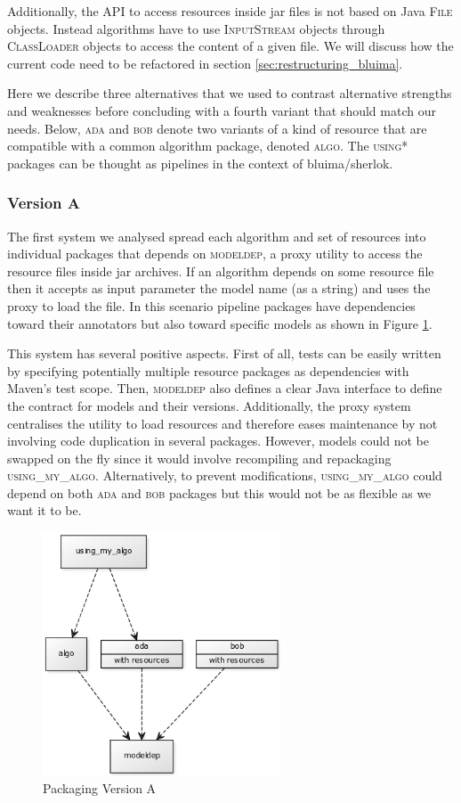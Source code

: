 \documentclass{article}
\newcommand{\id}[1]{\mbox{\textsc{#1}}}
\begin{document}
Additionally, the API to access resources inside jar files is not based on Java \id{File} objects. Instead algorithms have to use \id{InputStream} objects through \id{ClassLoader} objects to access the content of a given file. We will discuss how the current code need to be refactored in section \ref{sec:restructuring_bluima}.

Here we describe three alternatives that we used to contrast alternative strengths and weaknesses before concluding with a fourth variant that should match our needs. Below, \id{ada} and \id{bob} denote two variants of a kind of resource that are compatible with a common algorithm package, denoted \id{algo}. The \id{using*} packages can be thought as pipelines in the context of bluima/sherlok.

\subsubsection{Version A}

The first system we analysed spread each algorithm and set of resources into individual packages that depends on \id{modeldep}, a proxy utility to access the resource files inside jar archives. If an algorithm depends on some resource file then it accepts as input parameter the model name (as a string) and uses the proxy to load the file. In this scenario pipeline packages have dependencies toward their annotators but also toward specific models as shown in Figure \ref{fig:pkgsysA}.

This system has several positive aspects. First of all, tests can be easily written by specifying potentially multiple resource packages as dependencies with Maven's test scope. Then, \id{modeldep} also defines a clear Java interface to define the contract for models and their versions. Additionally, the proxy system centralises the utility to load resources and therefore eases maintenance by not involving code duplication in several packages. However, models could not be swapped on the fly since it would involve recompiling and repackaging \id{using\_my\_algo}.  Alternatively, to prevent modifications, \id{using\_my\_algo} could depend on both \id{ada} and \id{bob} packages but this would not be as flexible as we want it to be.

\begin{figure}
\centering
\includegraphics[width=200pt]{res/packaging_version_A.png}
\caption{Packaging Version A}
\label{fig:pkgsysA}
\end{figure}
\end{document}
